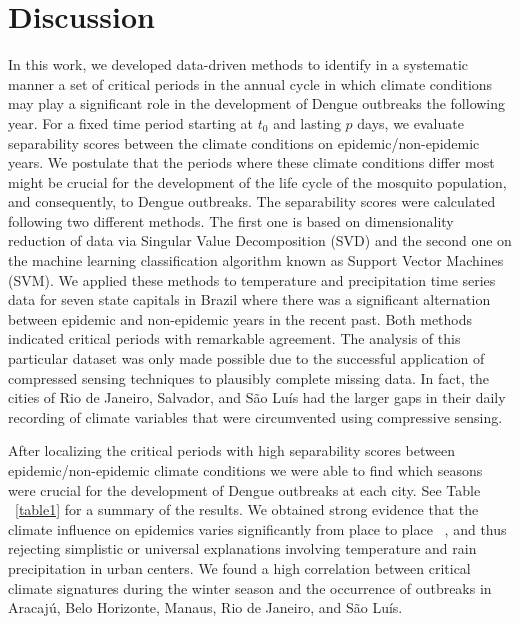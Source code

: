 \documentclass[final,leqno]{siamltexmm2}
\begin{document}
%
%
\section*{Discussion}
In this work, we developed data-driven methods to identify in a systematic manner a set of 
critical periods in the annual cycle in which climate conditions may play a significant role 
in the development of Dengue outbreaks the following year. For a fixed time period starting at $t_{0}$ 
and lasting $p$ days, we evaluate separability scores between the climate conditions on 
epidemic/non-epidemic years. We postulate that the periods where these climate conditions differ 
most might be crucial for the development of the life cycle of the mosquito population, and consequently, 
to Dengue outbreaks. 
%
The separability scores were calculated following two different methods. The first one 
is based on dimensionality reduction of data via Singular Value Decomposition (SVD) and the second one 
on the machine learning classification algorithm known as Support Vector Machines (SVM).   
%
We applied these methods to temperature and precipitation time series data for seven state capitals in 
Brazil where there was a significant alternation between epidemic and non-epidemic years in 
the recent past. Both methods indicated critical periods with remarkable agreement. 
The analysis of this particular dataset was only made possible due to the successful application 
of compressed sensing techniques to plausibly complete missing data. In fact, the cities of 
Rio de Janeiro, Salvador, and São Luís had the larger gaps in their daily recording of climate
variables that were circumvented using compressive sensing.

After localizing the critical periods with high separability scores between epidemic/non-epidemic climate conditions
we were able to find which seasons were crucial for the development of Dengue outbreaks at each city. See 
Table ~\ref{table1} for a summary of the results. We obtained strong evidence that the climate influence on epidemics 
varies significantly from place to place ~\cite{Adde,Liao2014,Johansson2009}, and thus rejecting simplistic or universal 
explanations involving temperature and rain precipitation in urban centers. We found a high correlation between critical 
climate signatures during the winter season and the occurrence of outbreaks in Aracajú, Belo Horizonte, Manaus, 
Rio de Janeiro, and S\~ao Luís. 
\end{document}
